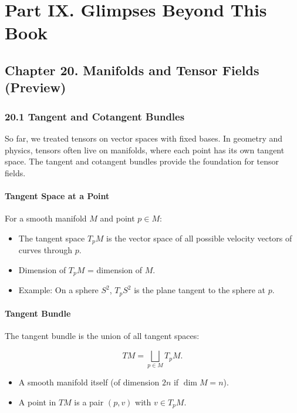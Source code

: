 \documentclass[
  letterpaper,
  DIV=11,
  numbers=noendperiod]{scrreprt}
\providecommand{\tightlist}{%
  \setlength{\itemsep}{0pt}\setlength{\parskip}{0pt}}
\begin{document}

\chapter{Part IX. Glimpses Beyond This
Book}\label{part-ix.-glimpses-beyond-this-book}

\section{Chapter 20. Manifolds and Tensor Fields
(Preview)}\label{chapter-20.-manifolds-and-tensor-fields-preview}

\subsection{20.1 Tangent and Cotangent
Bundles}\label{tangent-and-cotangent-bundles}

So far, we treated tensors on vector spaces with fixed bases. In
geometry and physics, tensors often live on manifolds, where each point
has its own tangent space. The tangent and cotangent bundles provide the
foundation for tensor fields.

\subsubsection{Tangent Space at a Point}\label{tangent-space-at-a-point}

For a smooth manifold \(M\) and point \(p \in M\):

\begin{itemize}
\tightlist
\item
  The tangent space \(T_p M\) is the vector space of all possible
  velocity vectors of curves through \(p\).
\item
  Dimension of \(T_p M\) = dimension of \(M\).
\item
  Example: On a sphere \(S^2\), \(T_p S^2\) is the plane tangent to the
  sphere at \(p\).
\end{itemize}

\subsubsection{Tangent Bundle}\label{tangent-bundle}

The tangent bundle is the union of all tangent spaces:

\[
TM = \bigsqcup_{p \in M} T_p M.
\]

\begin{itemize}
\tightlist
\item
  A smooth manifold itself (of dimension \(2n\) if \(\dim M = n\)).
\item
  A point in \(TM\) is a pair \((p, v)\) with \(v \in T_p M\).
\end{itemize}
\end{document}
